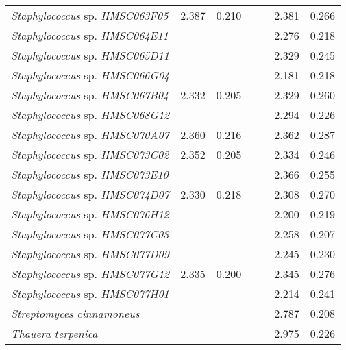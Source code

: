 \begin{longtable}{l|rr|rr|rr}
\textit{Staphylococcus} sp. \textit{HMSC063F05} & 2.387 & 0.210 &  &  & 2.381 & 0.266 \\
\textit{Staphylococcus} sp. \textit{HMSC064E11} &  &  &  &  & 2.276 & 0.218 \\
\textit{Staphylococcus} sp. \textit{HMSC065D11} &  &  &  &  & 2.329 & 0.245 \\
\textit{Staphylococcus} sp. \textit{HMSC066G04} &  &  &  &  & 2.181 & 0.218 \\
\textit{Staphylococcus} sp. \textit{HMSC067B04} & 2.332 & 0.205 &  &  & 2.329 & 0.260 \\
\textit{Staphylococcus} sp. \textit{HMSC068G12} &  &  &  &  & 2.294 & 0.226 \\
\textit{Staphylococcus} sp. \textit{HMSC070A07} & 2.360 & 0.216 &  &  & 2.362 & 0.287 \\
\textit{Staphylococcus} sp. \textit{HMSC073C02} & 2.352 & 0.205 &  &  & 2.334 & 0.246 \\
\textit{Staphylococcus} sp. \textit{HMSC073E10} &  &  &  &  & 2.366 & 0.255 \\
\textit{Staphylococcus} sp. \textit{HMSC074D07} & 2.330 & 0.218 &  &  & 2.308 & 0.270 \\
\textit{Staphylococcus} sp. \textit{HMSC076H12} &  &  &  &  & 2.200 & 0.219 \\
\textit{Staphylococcus} sp. \textit{HMSC077C03} &  &  &  &  & 2.258 & 0.207 \\
\textit{Staphylococcus} sp. \textit{HMSC077D09} &  &  &  &  & 2.245 & 0.230 \\
\textit{Staphylococcus} sp. \textit{HMSC077G12} & 2.335 & 0.200 &  &  & 2.345 & 0.276 \\
\textit{Staphylococcus} sp. \textit{HMSC077H01} &  &  &  &  & 2.214 & 0.241 \\
\textit{Streptomyces cinnamoneus} &  &  &  &  & 2.787 & 0.208 \\
\textit{Thauera terpenica} &  &  &  &  & 2.975 & 0.226
\end{longtable}